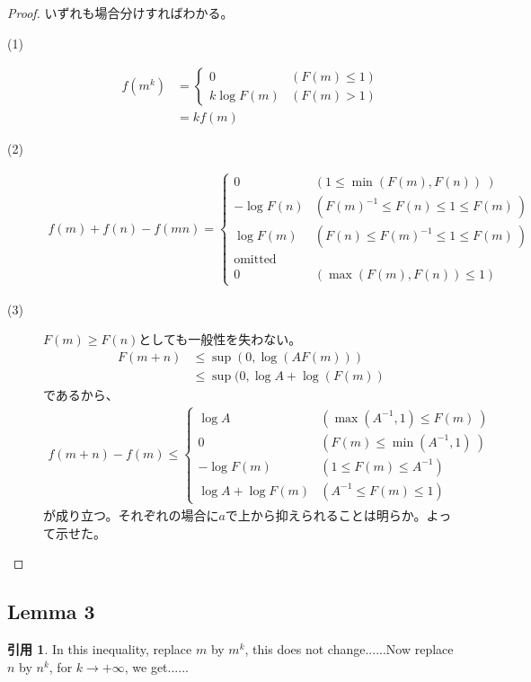 \documentclass[12pt]{jsarticle}%
\renewenvironment{leftbar}{%
  \renewcommand\FrameCommand{\vrule width 1pt \hspace{10pt}}%
  \MakeFramed {\advance\hsize-\width \FrameRestore}}%
 {\endMakeFramed}
\newcommand{\barquo}[1]{\begin{leftbar} \begin{quo} #1 \end{quo} \end{leftbar}}%
\newcommand{\bfsubsection}[1]{\subsection*{\textbf{#1}}}
\theoremstyle{definition}%
\newtheorem*{quo}{引用}
\begin{document}
\begin{proof}
いずれも場合分けすればわかる。

\begin{description}
  \item[(1)]
  \begin{align*}
  f(m^k) &= \begin{cases}
  0 &(F(m) \leq 1) \\
  k\log F(m) &(F(m) > 1)
  \end{cases} \\
  &=kf(m)
  \end{align*}
  \item[(2)]
  \begin{align*}
    f(m)+f(n)-f(mn)= \begin{cases}
  0 &(  1 \leq \min(F(m),F(n)) \ ) \\
  - \log F(n) &(F(m)^{-1} \leq F(n) \leq 1 \leq F(m) \ ) \\
  \log F(m) &(F(n) \leq F(m)^{-1} \leq 1 \leq F(m) \ ) \\
  \mathrm{omitted} \\
  0 &(\max(F(m),F(n)) \leq 1 )
  \end{cases}
  \end{align*}
  \item[(3)]
  $F(m) \geq F(n)$としても一般性を失わない。\\
  \begin{align*}
    F(m + n) &\leq \sup(0, \log(A F(m))) \\
    &\leq \sup(0,\log A + \log(F(m))
  \end{align*}
  であるから、
  \begin{align*}
    f(m+n)-f(m) \leq \begin{cases}
    \log A &(\max(A^{-1}, 1) \leq F(m) \ ) \\
    0 &(F(m) \leq \min(A^{-1},1) \ ) \\
    - \log F(m) &(1 \leq F(m) \leq A^{-1}) \\
    \log A + \log F(m) &(A^{-1} \leq F(m) \leq 1)
  \end{cases}
  \end{align*}
  が成り立つ。それぞれの場合に$a$で上から抑えられることは明らか。よって示せた。
\end{description}

\end{proof}


\bfsubsection{Lemma 3}
\barquo{
In this inequality, replace $m$ by $m^k$, this does not change......Now replace $n$ by $n^k$, for $k \rightarrow +\infty$, we get......}
\end{document}
